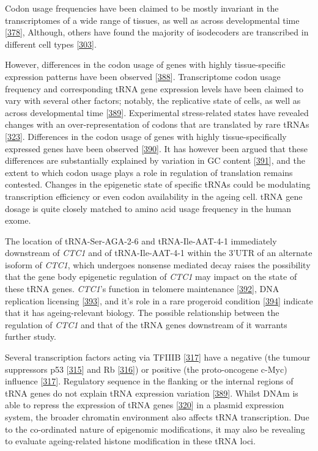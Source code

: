 \documentclass[
]{book}
\begin{document}
Codon usage frequencies have been claimed to be mostly invariant in the transcriptomes of a wide range of tissues, as well as across developmental time {[}\protect\hyperlink{ref-Schmitt2014b}{378}{]}, Although, others have found the majority of isodecoders are transcribed in different cell types {[}\protect\hyperlink{ref-Parisien2013}{303}{]}.

However, differences in the codon usage of genes with highly tissue-specific expression patterns have been observed {[}\protect\hyperlink{ref-Plotkin2004}{388}{]}.
Transcriptome codon usage frequency and corresponding tRNA gene expression levels have been claimed to vary with several other factors; notably, the replicative state of cells, as well as across developmental time {[}\protect\hyperlink{ref-Schmitt2014}{389}{]}.
Experimental stress-related states have revealed changes with an over-representation of codons that are translated by rare tRNAs {[}\protect\hyperlink{ref-Gingold2012}{323}{]}.
Differences in the codon usage of genes with highly tissue-specifically expressed genes have been observed {[}\protect\hyperlink{ref-Powell1997}{390}{]}.
It has however been argued that these differences are substantially explained by variation in GC content {[}\protect\hyperlink{ref-Rudolph2016}{391}{]}, and the extent to which codon usage plays a role in regulation of translation remains contested.
Changes in the epigenetic state of specific tRNAs could be modulating transcription efficiency or even codon availability in the ageing cell.
tRNA gene dosage is quite closely matched to amino acid usage frequency in the human exome.

The location of tRNA-Ser-AGA-2-6 and tRNA-Ile-AAT-4-1 immediately downstream of \emph{CTC1} and of tRNA-Ile-AAT-4-1 within the 3'UTR of an alternate isoform of \emph{CTC1}, which undergoes nonsense mediated decay raises the possibility that the gene body epigenetic regulation of \emph{CTC1} may impact on the state of these tRNA genes.
\emph{CTC1}'s function in telomere maintenance {[}\protect\hyperlink{ref-Gu2018}{392}{]}, DNA replication licensing {[}\protect\hyperlink{ref-Wang2019a}{393}{]}, and it's role in a rare progeroid condition {[}\protect\hyperlink{ref-Sargolzaeiaval2018}{394}{]} indicate that it has ageing-relevant biology. The possible relationship between the regulation of \emph{CTC1} and that of the tRNA genes downstream of it warrants further study.

Several transcription factors acting via TFIIIB {[}\protect\hyperlink{ref-Gomez-Roman2003}{317}{]} have a negative (the tumour suppressors p53 {[}\protect\hyperlink{ref-Crighton2003}{315}{]} and Rb {[}\protect\hyperlink{ref-Sutcliffe2000}{316}{]}) or positive (the proto-oncogene c-Myc) influence {[}\protect\hyperlink{ref-Gomez-Roman2003}{317}{]}.
Regulatory sequence in the flanking or the internal regions of tRNA genes do not explain tRNA expression variation {[}\protect\hyperlink{ref-Schmitt2014}{389}{]}.
Whilst DNAm is able to repress the expression of tRNA genes {[}\protect\hyperlink{ref-Besser1990}{320}{]} in a plasmid expression system, the broader chromatin environment also affects tRNA transcription.
Due to the co-ordinated nature of epigenomic modifications, it may also be revealing to evaluate ageing-related histone modification in these tRNA loci.
\end{document}
